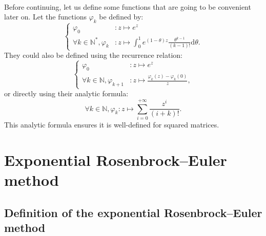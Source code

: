    \paragraph{}
    Before continuing, let us define some functions that are going to be convenient later on.
    Let the functions $\varphi_k$ be defined by:
    \begin{equation}
      \left\{\begin{aligned}
        \varphi_0 &: z \mapsto e^z \\
        \forall k \in \mathbb{N}^*, \varphi_{k} &: z \mapsto \int_0^1 e^{\left(1 - \theta\right)z} \frac{\theta^{k-1}}{\left(k-1\right)!} \mathrm{d}\theta .
      \end{aligned}\right.
    \end{equation}
    They could also be defined using the recurrence relation:
    \begin{equation}
      \left\{\begin{aligned}
        \varphi_0 &: z \mapsto e^z \\
        \forall k \in \mathbb{N}, \varphi_{k+1} &: z \mapsto \frac{\varphi_k\left(z\right) - \varphi_k\left(0\right)}{z} ,
      \end{aligned}\right.
    \end{equation}
    or directly using their analytic formula:
    \begin{equation}
      \forall k \in \mathbb{N}, \varphi_{k} : z \mapsto \sum_{i = 0}^{+\infty} \frac{z^i}{\left(i + k\right)!} .
    \end{equation}
    This analytic formula ensures it is well-defined for squared matrices.


  \pagebreak
  \section{Exponential Rosenbrock--Euler method}

    \subsection{Definition of the exponential Rosenbrock--Euler method}


